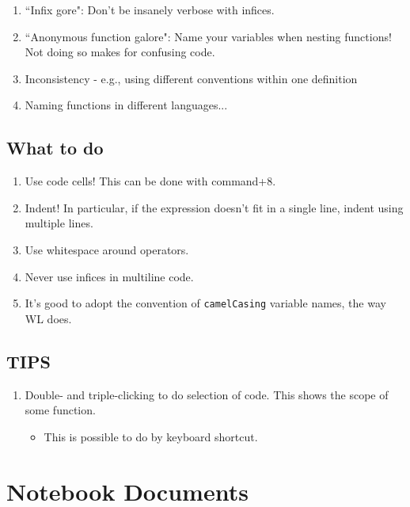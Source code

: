 \documentclass[11pt]{article}
\theoremstyle{definition}
\begin{document}
\begin{enumerate}
\item ``Infix gore": Don't be insanely verbose with infices.
\item ``Anonymous function galore": Name your variables when nesting functions! Not doing so makes for confusing code. 
\item Inconsistency - e.g., using different conventions within one definition
\item Naming functions in different languages...
\end{enumerate}

\subsection{What to do}

\begin{enumerate}
\item Use code cells! This can be done with command+8.
\item Indent! In particular, if the expression doesn't fit in a single line, indent using multiple lines.
\item Use whitespace around operators.
\item Never use infices in multiline code.
\item It's good to adopt the convention of \verb|camelCasing| variable names, the way WL does.
\end{enumerate}

\subsection{TIPS}

\begin{enumerate}
\item Double- and triple-clicking to do selection of code. This shows the scope of some function. 
\begin{itemize}
\item This is possible to do by keyboard shortcut.
\end{itemize}
\end{enumerate}

\section{Notebook Documents}
\end{document}
